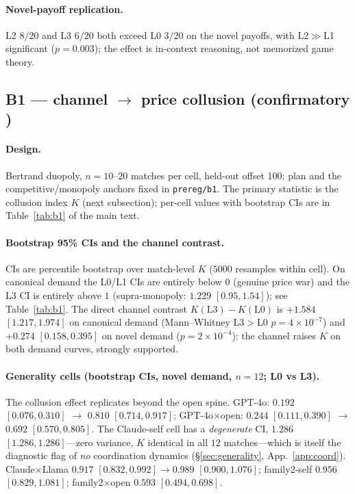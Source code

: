 \paragraph{Novel-payoff replication.} L2 $8/20$ and L3 $6/20$ both exceed L0 $3/20$ on the
novel payoffs, with L2$\gg$L1 significant ($p{=}0.003$); the effect is in-context reasoning, not
memorized game theory.

\subsection{B1 --- channel $\to$ price collusion (confirmatory \tC)}
\label{app:b1}

\paragraph{Design.} Bertrand duopoly, $n{=}10$--$20$ matches per cell, held-out offset 100;
plan and the competitive/monopoly anchors fixed in \texttt{prereg/b1}. The primary statistic is
the collusion index $K$ (next subsection); per-cell values with bootstrap CIs are in
Table~\ref{tab:b1} of the main text.

\paragraph{Bootstrap 95\% CIs and the channel contrast.}
CIs are percentile bootstrap over match-level $K$ ($5000$ resamples within cell). On canonical
demand the L0/L1 CIs are entirely below $0$ (genuine price war) and the L3 CI is entirely above
$1$ (supra-monopoly: $1.229$ $[0.95,1.54]$); see Table~\ref{tab:b1}. The direct channel contrast
$K(\text{L3}){-}K(\text{L0})$ is $+1.584$ $[1.217,1.974]$ on canonical demand (Mann--Whitney
L3$>$L0 $p{=}4{\times}10^{-7}$) and $+0.274$ $[0.158,0.395]$ on novel demand
($p{=}2{\times}10^{-4}$): the channel raises $K$ on both demand curves, strongly supported.

\paragraph{Generality cells (bootstrap CIs, novel demand, $n{=}12$; L0 vs L3).}
The collusion effect replicates beyond the open spine. GPT-4o: $0.192$ $[0.076,0.310]$ $\to$
$0.810$ $[0.714,0.917]$; GPT-4o$\times$open: $0.244$ $[0.111,0.390]$ $\to$ $0.692$
$[0.570,0.805]$. The Claude-self cell has a \emph{degenerate} CI, $1.286$ $[1.286,1.286]$---zero
variance, $K$ identical in all $12$ matches---which is itself the diagnostic flag of \emph{no}
coordination dynamics (\S\ref{sec:generality}, App.~\ref{app:coord}). Claude$\times$Llama
$0.917$ $[0.832,0.992]\to0.989$ $[0.900,1.076]$; family2-self $0.956$ $[0.829,1.081]$;
family2$\times$open $0.593$ $[0.494,0.698]$.


